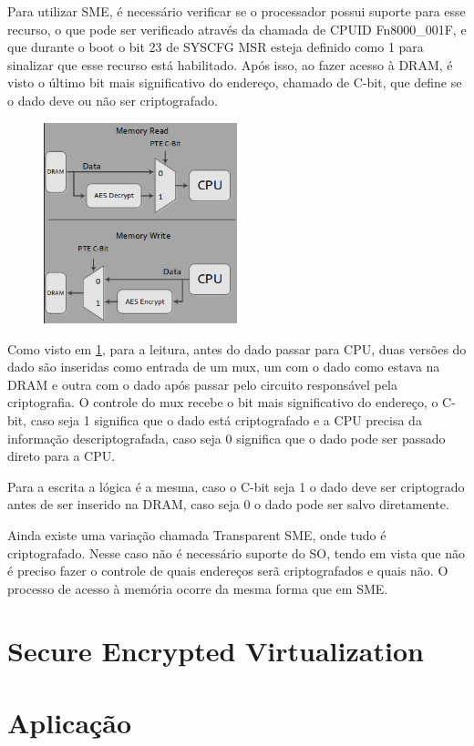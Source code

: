 \documentclass{report}
\begin{document}
Para utilizar SME, é necessário verificar se o processador possui suporte para
esse recurso, o que pode ser verificado através da chamada de CPUID
Fn8000\_001F, e que durante o boot o bit 23 de SYSCFG MSR esteja definido como 1
para sinalizar que esse recurso está habilitado. Após isso, ao fazer acesso à
DRAM, é visto o último bit mais significativo do endereço, chamado de C-bit,
que define se o dado deve ou não ser criptografado.

\begin{figure}[h]
    \centering
    \includegraphics[width=0.5\textwidth]{img/sme_read_write_architecture}
    \label{sme-read-write}
\end{figure}

Como visto em \ref{sme-read-write}, para a leitura, antes do dado passar para
CPU, duas versões do dado são inseridas como entrada de um mux, um com o dado
como estava na DRAM e outra com o dado após passar pelo circuito responsável
pela criptografia. O controle do mux recebe o bit mais significativo do
endereço, o C-bit, caso seja 1 significa que o dado está criptografado e a CPU
precisa da informação descriptografada, caso seja 0 significa que o dado pode
ser passado direto para a CPU.

Para a escrita a lógica é a mesma, caso o C-bit seja 1 o dado deve ser
criptogrado antes de ser inserido na DRAM, caso seja 0 o dado pode ser salvo
diretamente.

Ainda existe uma variação chamada Transparent SME, onde tudo é criptografado.
Nesse caso não é necessário suporte do SO, tendo em vista que não é preciso
fazer o controle de quais endereços serã criptografados e quais não. O processo
de acesso à memória ocorre da mesma forma que em SME.


\section{Secure Encrypted Virtualization}

\section{Aplicação}


\nocite{*}

\end{document}

